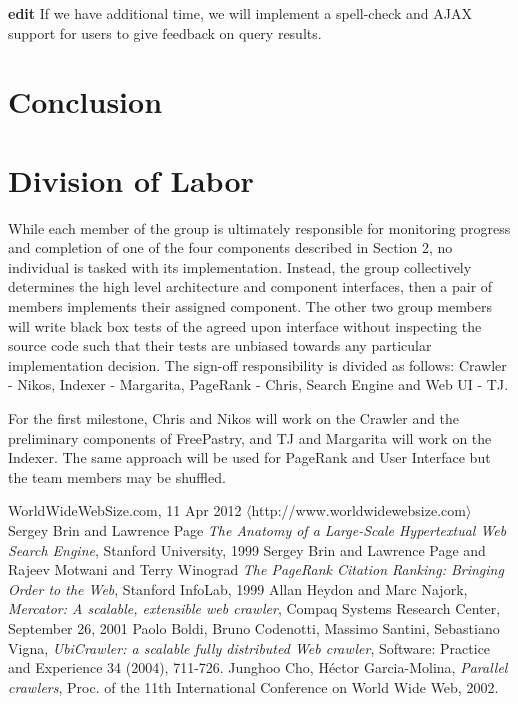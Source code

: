 \documentclass[11pt, letterpaper, oneside, twocolumn]{article}
\begin{document}
\textbf{edit}
If we have additional time, we will implement a spell-check and AJAX support for users to give feedback on query results.


\section{Conclusion}
\label{sec:conculsion}

\section{ Division of Labor }
\label{sec:labor}

While each member of the group is ultimately responsible for monitoring progress and completion of one of the four components described in Section 2, no individual is tasked with its implementation.
Instead, the group collectively determines the high level architecture and component interfaces, then a pair of members implements their assigned component.
The other two group members will write black box tests of the agreed upon interface without inspecting the source code such that their tests are unbiased towards any particular implementation decision.
The sign-off responsibility is divided as follows: Crawler - Nikos, Indexer - Margarita, PageRank - Chris, Search Engine and Web UI - TJ.

For the first milestone, Chris and Nikos will work on the Crawler and the preliminary components of FreePastry, and TJ and Margarita will work on the Indexer.
The same approach will be used for PageRank and User Interface but the team members may be shuffled.

\begin{thebibliography}{9}

   WorldWideWebSize.com, 11 Apr 2012 $\langle$http://www.worldwidewebsize.com$\rangle$
   Sergey Brin and Lawrence Page \emph{The Anatomy of a Large-Scale Hypertextual Web Search Engine}, Stanford University, 1999
   Sergey Brin and  Lawrence Page and Rajeev Motwani and Terry Winograd \emph{The PageRank Citation Ranking: Bringing Order to the Web}, Stanford InfoLab, 1999
   Allan Heydon and Marc Najork, \emph{Mercator: A scalable, extensible web crawler}, Compaq Systems Research Center, September 26, 2001
   Paolo Boldi, Bruno Codenotti, Massimo Santini, Sebastiano Vigna, \emph{UbiCrawler: a scalable fully distributed Web crawler}, Software: Practice and Experience 34 (2004), 711-726.
   Junghoo Cho, H\'{e}ctor Garcia-Molina, \emph{Parallel crawlers}, Proc. of the 11th International Conference on World Wide Web, 2002.


\end{thebibliography}
\end{document}
